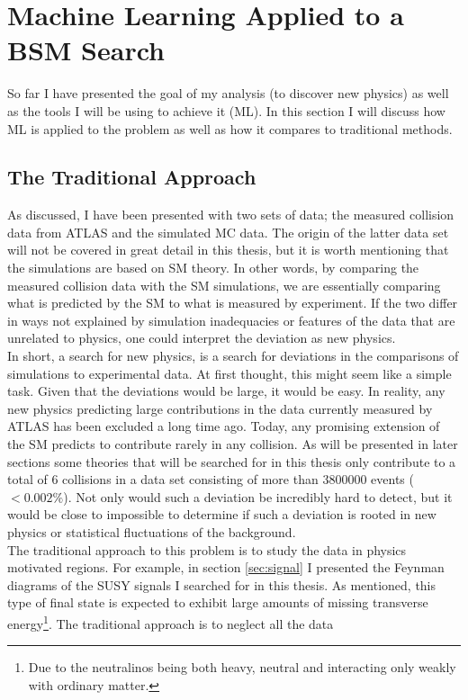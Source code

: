 \section{Machine Learning Applied to a BSM Search}\label{sec:MLHEP}
So far I have presented the goal of my analysis (to discover new physics)
as well as the tools I will be using to achieve it (\ac{ML}). In this section
I will discuss how \ac{ML} is applied to the problem as well as how it compares
to traditional methods.
\subsection{The Traditional Approach}
As discussed, I have been presented with two sets of data; the measured collision 
data from \ac{ATLAS} and the simulated \ac{MC} data. The origin of the latter data set 
will not be covered in great detail in this thesis, but it is worth mentioning that 
the simulations are based on \ac{SM} theory. In other words, by comparing the measured collision 
data with the \ac{SM} simulations, we are essentially comparing what is predicted by the \ac{SM} 
to what is measured by experiment. If the two differ in ways not explained by simulation inadequacies or
features of the data that are unrelated to physics, one could interpret the deviation 
as new physics.
\\
In short, a search for new physics, is a search for deviations in the comparisons of simulations 
to experimental data. At first thought, this might seem like a simple task. Given that the deviations 
would be large, it would be easy. In reality, any new physics predicting large contributions 
in the data currently measured by \ac{ATLAS} has been excluded a long time ago. Today, any
promising extension of the \ac{SM} predicts to contribute rarely in any collision. As will 
be presented in later sections some theories that will be searched for in this thesis only 
contribute to a total of 6 collisions in a data set consisting of more than $3800000$ events 
($<0.002\%$). Not only would such a deviation be incredibly hard to detect, but it would 
be close to impossible to determine if such a deviation is rooted in new physics or statistical fluctuations 
of the background. 
\\
The traditional approach to this problem is to study the data in physics motivated regions. 
For example, in section \ref{sec:signal} I presented the Feynman diagrams of the \ac{SUSY} signals I 
searched for in this thesis. As mentioned, this type of final state is expected to exhibit 
large amounts of missing transverse energy\footnote{Due to the neutralinos being both heavy, neutral 
and interacting only weakly with ordinary matter.}. The traditional approach is to neglect all the data 
